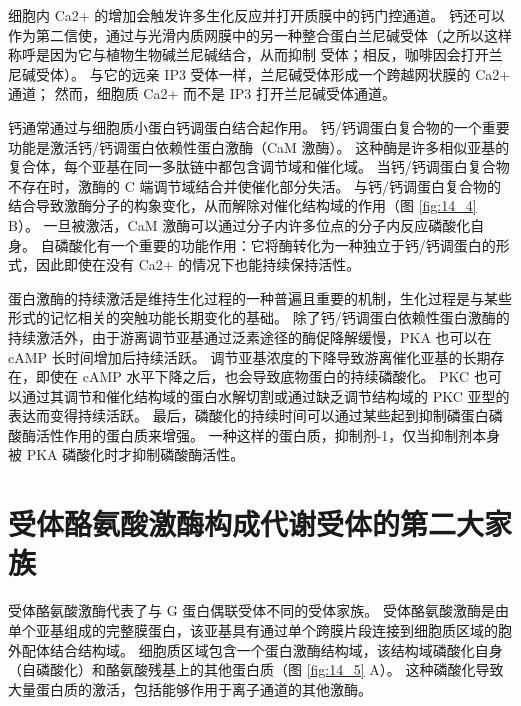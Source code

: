 细胞内 Ca2+ 的增加会触发许多生化反应并打开质膜中的钙门控通道。
钙还可以作为第二信使，通过与光滑内质网膜中的另一种整合蛋白兰尼碱受体（之所以这样称呼是因为它与植物生物碱兰尼碱结合，从而抑制 受体；相反，咖啡因会打开兰尼碱受体）。
与它的远亲 IP3 受体一样，兰尼碱受体形成一个跨越网状膜的 Ca2+ 通道； 
然而，细胞质 Ca2+ 而不是 IP3 打开兰尼碱受体通道。


钙通常通过与细胞质小蛋白钙调蛋白结合起作用。
钙/钙调蛋白复合物的一个重要功能是激活钙/钙调蛋白依赖性蛋白激酶（CaM 激酶）。
这种酶是许多相似亚基的复合体，每个亚基在同一多肽链中都包含调节域和催化域。
当钙/钙调蛋白复合物不存在时，激酶的 C 端调节域结合并使催化部分失活。
与钙/钙调蛋白复合物的结合导致激酶分子的构象变化，从而解除对催化结构域的作用（图 \ref{fig:14_4} B）。
一旦被激活，CaM 激酶可以通过分子内许多位点的分子内反应磷酸化自身。
自磷酸化有一个重要的功能作用：它将酶转化为一种独立于钙/钙调蛋白的形式，因此即使在没有 Ca2+ 的情况下也能持续保持活性。


蛋白激酶的持续激活是维持生化过程的一种普遍且重要的机制，生化过程是与某些形式的记忆相关的突触功能长期变化的基础。
除了钙/钙调蛋白依赖性蛋白激酶的持续激活外，由于游离调节亚基通过泛素途径的酶促降解缓慢，PKA 也可以在 cAMP 长时间增加后持续活跃。
调节亚基浓度的下降导致游离催化亚基的长期存在，即使在 cAMP 水平下降之后，也会导致底物蛋白的持续磷酸化。
PKC 也可以通过其调节和催化结构域的蛋白水解切割或通过缺乏调节结构域的 PKC 亚型的表达而变得持续活跃。
最后，磷酸化的持续时间可以通过某些起到抑制磷蛋白磷酸酶活性作用的蛋白质来增强。
一种这样的蛋白质，抑制剂-1，仅当抑制剂本身被 PKA 磷酸化时才抑制磷酸酶活性。


\section{受体酪氨酸激酶构成代谢受体的第二大家族}

受体酪氨酸激酶代表了与 G 蛋白偶联受体不同的受体家族。
受体酪氨酸激酶是由单个亚基组成的完整膜蛋白，该亚基具有通过单个跨膜片段连接到细胞质区域的胞外配体结合结构域。
细胞质区域包含一个蛋白激酶结构域，该结构域磷酸化自身（自磷酸化）和酪氨酸残基上的其他蛋白质（图 \ref{fig:14_5} A）。
这种磷酸化导致大量蛋白质的激活，包括能够作用于离子通道的其他激酶。

